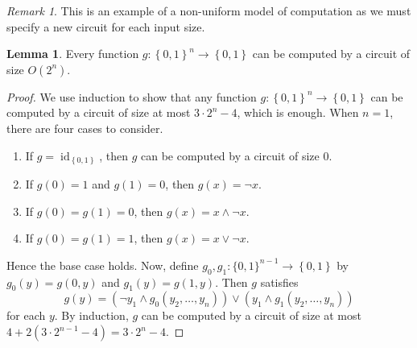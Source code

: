 \documentclass[10pt,letterpaper,cm]{nupset}
\theoremstyle{definition}
\theoremstyle{theorem}
\newtheorem{lemma}[definition]{Lemma}
\theoremstyle{remark}
\newtheorem{remark}[definition]{Remark}
\newcommand{\1}{\mathbf{1}}
\newcommand{\0}{\vec 0}
\DeclareMathOperator{\id}{id}
\begin{document}
\begin{remark}
This is an example of a non-uniform model of computation as we must specify a new circuit for each input size. 
\end{remark}

\begin{lemma}\label{pl1}
Every function $g: \left\{0,1\right\}^n \to \left\{0,1\right\}$ can be computed by a circuit of size $O(2^n)$. 
\end{lemma}
\begin{proof}
We use induction to show that any function $g:\left\{0,1\right\}^n \to \left\{0,1\right\}$ can be computed by a circuit of size at most $3 \cdot 2^n -4$, which is enough. When $n=1$, there are four cases to consider.
\begin{enumerate}[label=(\alph*)]
\item If $g= \id_{\left\{0,1\right\}}$, then $g$ can be computed by a circuit of size $0$.
\item If $g(0) =1$ and $g(1) =0$, then $g(x) = \neg{x}$.
\item If $g(0) = g(1) = 0$, then $g(x) = x \land \neg{x}$.
\item If $g(0) = g(1) = 1$, then $g(x) = x \vee \neg{x}$.
\end{enumerate}
Hence the base case holds. Now, define $g_0, g_1 : \{0,1 \}^{n-1} \to \left\{0,1\right\}$ by $g_0(y) = g(0, y)$ and $g_1(y) = g(1,y)$. Then $g$ satisfies $$g(y) = \left(\neg y_1 \land g_0(y_2, \ldots, y_n)\right) \vee \left(y_1 \land g_1(y_2, \ldots, y_n)\right)$$ for each $y$. By induction, $g$ can be computed by a circuit of size at most $4 + 2(3 \cdot 2^{n-1} -4) = 3 \cdot 2^n -4$. 
\end{proof}
\end{document}
